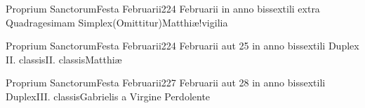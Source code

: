 \documentclass[liber-responsorialis_sanctorale.tex]{subfiles}
\begin{document}
	{Proprium Sanctorum}{Festa Februarii}{2}{24 Februarii in anno bissextili extra Quadragesimam}
	{Simplex}{(Omittitur)}{Matthiæ!vigilia}
	{}
	{}
\rubric{\respdetemp}

	{Proprium Sanctorum}{Festa Februarii}{2}{24 Februarii aut 25 in anno bissextili}
	{Duplex II. classis}{II. classis}{Matthiæ}
	{}
	{}
\rubric{\apexrubric}

	{Proprium Sanctorum}{Festa Februarii}{2}{27 Februarii aut 28 in anno bissextili}
	{Duplex}{III. classis}{Gabrielis a Virgine Perdolente}
	{\conprubric}
	{\respdetemp}
\end{document}
